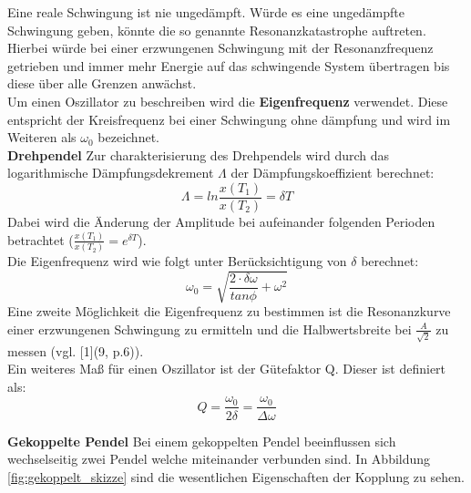 \documentclass[12pt,a4paper]{article}
\begin{document}
\begin{multicols}{2}
Eine reale Schwingung ist nie ungedämpft. Würde es eine ungedämpfte Schwingung geben, könnte die so genannte Resonanzkatastrophe auftreten. Hierbei würde bei einer erzwungenen Schwingung mit der Resonanzfrequenz getrieben und immer mehr Energie auf das schwingende System übertragen bis diese über alle Grenzen anwächst.\\
Um einen Oszillator zu beschreiben wird die \textbf{Eigenfrequenz} verwendet. Diese entspricht der Kreisfrequenz bei einer Schwingung ohne dämpfung und wird im Weiteren als $\omega_0$ bezeichnet.\\

\textbf{Drehpendel}
Zur charakterisierung des Drehpendels wird durch das logarithmische Dämpfungsdekrement $\Lambda$ der Dämpfungskoeffizient berechnet:
$$\Lambda = ln \frac{x(T_1)}{x(T_2)} = \delta T$$
Dabei wird die Änderung der Amplitude bei aufeinander folgenden Perioden betrachtet ($\frac{x(T_1)}{x(T_2)} = e^{\delta T}$).\\
Die Eigenfrequenz wird wie folgt unter Berücksichtigung von $\delta$ berechnet:
$$ \omega_0 = \sqrt{\frac{2\cdot \delta \omega}{tan \phi} + \omega^2 }$$
Eine zweite Möglichkeit die Eigenfrequenz zu bestimmen ist die Resonanzkurve einer erzwungenen Schwingung zu ermitteln und die Halbwertsbreite bei $\frac{A}{\sqrt{2}}$ zu messen (vgl. [1](9, p.6)).\\
Ein weiteres Maß für einen Oszillator ist der Gütefaktor Q. Dieser ist definiert als:
$$Q = \frac{\omega_0}{2\delta} = \frac{\omega_0}{\Delta \omega}$$

\textbf{Gekoppelte Pendel}
Bei einem gekoppelten Pendel beeinflussen sich wechselseitig zwei Pendel welche miteinander verbunden sind. In Abbildung \ref{fig:gekoppelt_skizze} sind die wesentlichen Eigenschaften der Kopplung zu sehen.


\end{multicols}
\end{document}
